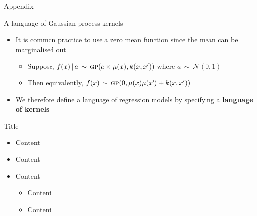 \begin{frame}{Appendix}
\end{frame}

\begin{frame}{A language of Gaussian process kernels}
  \begin{itemize}
    \item It is common practice to use a zero mean function since the mean can be marginalised out
  \begin{itemize}
    \item Suppose, ${f(x) \,|\, a \,\sim\, {\textsc{gp}}{}(a \times \mu(x), k(x,x'))}$ where $a \,\sim\, \mathcal{N}(0,1)$
    \item Then equivalently, $f(x) \,\sim\, {\textsc{gp}}{}(0, \mu(x)\mu(x') + k(x,x'))$
  \end{itemize}
  \vspace{\baselineskip}
  \item We therefore define a language of \gp{} regression models by
specifying a {\bf language of kernels}
  \end{itemize}
\end{frame}



\begin{frame}{Title}
  \begin{itemize}
    \item Content
    \vspace{\baselineskip}
    \item Content
    \vspace{\baselineskip}
    \item Content
    \begin{itemize}
       \item Content
       \item Content
     \end{itemize}
  \end{itemize}
\end{frame}
